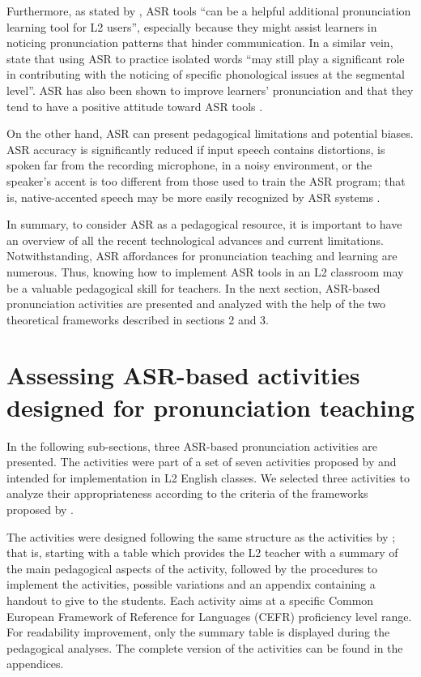 \documentclass[english]{textolivre}
\begin{document}
Furthermore, as stated by \textcite[p.~778]{kivistodesouza2022},
ASR tools ``can be a helpful additional pronunciation learning tool for
L2 users'', especially because they might assist learners in noticing
pronunciation patterns that hinder communication. In a similar vein,
\textcite[p.~14]{santos2024} state that using ASR to
practice isolated words ``may still play a significant role in
contributing with the noticing of specific phonological issues at the
segmental level''. ASR has also been shown to improve learners'
pronunciation and that they tend to have a positive attitude toward ASR
tools \cite{nickolai2024}.

On the other hand, ASR can present pedagogical limitations and potential
biases. ASR accuracy is significantly reduced if input speech contains
distortions, is spoken far from the recording microphone, in a noisy
environment, or the speaker's accent is too different from those used to
train the ASR program; that is, native-accented speech may be more
easily recognized by ASR systems \cite{jurafsky2024,oshaughnessy2024}.

In summary, to consider ASR as a pedagogical resource, it is important
to have an overview of all the recent technological advances and current
limitations. Notwithstanding, ASR affordances for pronunciation teaching
and learning are numerous. Thus, knowing how to implement ASR tools in
an L2 classroom may be a valuable pedagogical skill for teachers. In the
next section, ASR-based pronunciation activities are presented and
analyzed with the help of the two theoretical frameworks described in
sections 2 and 3.



\section{Assessing ASR-based activities designed for pronunciation
teaching}\label{sec-assessing}

In the following sub-sections, three ASR-based pronunciation activities
are presented. The activities were part of a set of seven activities
proposed by \textcite{gottardi2023} and intended for implementation in L2
English classes. We selected three activities to analyze their
appropriateness according to the criteria of the frameworks proposed by \textcite{celcemurcia2010,chapelle2001}.

The activities were designed following the same structure as the
activities by \textcite{stanley2013}; that is, starting with a table which
provides the L2 teacher with a summary of the main pedagogical aspects
of the activity, followed by the procedures to implement the activities,
possible variations and an appendix containing a handout to give to the
students. Each activity aims at a specific Common European Framework of
Reference for Languages (CEFR) proficiency level range. For readability
improvement, only the summary table is displayed during the pedagogical
analyses. The complete version of the activities can be found in the
appendices.
\end{document}
